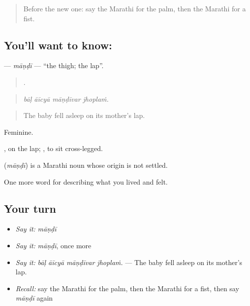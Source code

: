 \label{lesson:MR-C477-mandi}



\begin{quote}
Before the new one: say the Marathi for the palm, then the Marathi for a fist.
\end{quote}

\subsection*{You'll want to know: }
\textbf{} — \emph{māṇḍī} — \textquotedblleft{}the thigh; the lap\textquotedblright{}.

\begin{quote}
   .
\end{quote}

\begin{quote}
\emph{bāḷ āīcyā māṇḍīvar jhoplaṁ.}
\end{quote}

\begin{quote}
The baby fell asleep on its mother's lap.
\end{quote}

Feminine.

, on the lap;   , to sit cross-legged.

\begin{cousinweb}
\textbf{} (\emph{māṇḍī}) is a Marathi noun whose origin is not settled.
\end{cousinweb}

\begin{grammarlens}[title={What you've built}]
One more word for describing what you lived and felt.
\end{grammarlens}

\subsection*{Your turn}
\begin{itemize}
\raggedright
  \item \emph{Say it:} \emph{māṇḍī}
  \item \emph{Say it:} \emph{māṇḍī}, once more
  \item \emph{Say it:} \emph{bāḷ āīcyā māṇḍīvar jhoplaṁ.} — The baby fell asleep on its mother's lap.
  \item \emph{Recall:} say the Marathi for the palm, then the Marathi for a fist, then say \emph{māṇḍī} again
\end{itemize}

